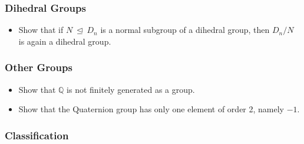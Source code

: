 \hypertarget{dihedral-groups}{%
\subsubsection{Dihedral Groups}\label{dihedral-groups}}

\begin{itemize}
\tightlist
\item
  Show that if \(N{~\trianglelefteq~}D_n\) is a normal subgroup of a
  dihedral group, then \(D_n/N\) is again a dihedral group.
\end{itemize}

\hypertarget{other-groups}{%
\subsubsection{Other Groups}\label{other-groups}}

\begin{itemize}
\tightlist
\item
  Show that \({\mathbb{Q}}\) is not finitely generated as a group.
\item
  Show that the Quaternion group has only one element of order 2, namely
  \(-1\).
\end{itemize}

\hypertarget{classification}{%
\subsubsection{Classification}\label{classification}}

